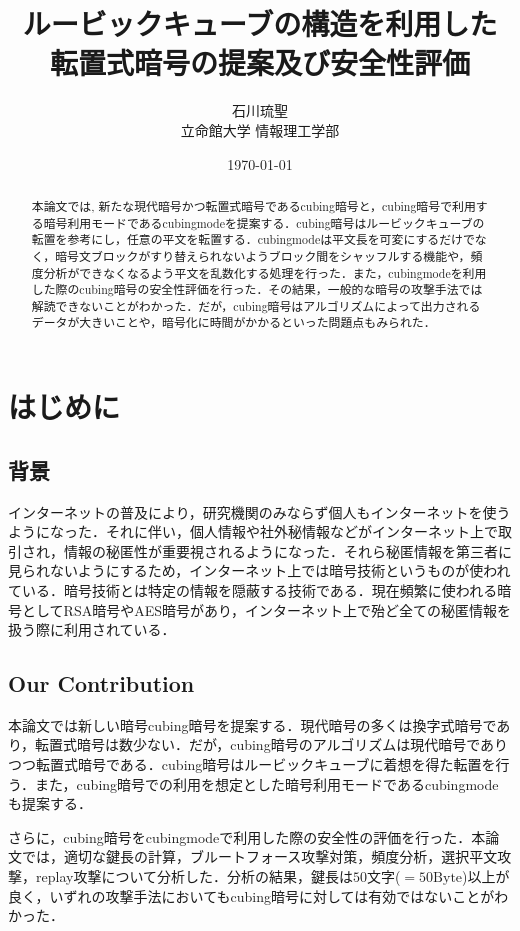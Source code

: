 \documentclass[a4j,titlepage]{jsarticle}
\title{ルービックキューブの構造を利用した\\転置式暗号の提案及び安全性評価}
\author{石川琉聖\\立命館大学 情報理工学部}
\date{\today}
\begin{document}
\maketitle

\begin{abstract}
本論文では, 新たな現代暗号かつ転置式暗号であるcubing暗号と，cubing暗号で利用する暗号利用モードであるcubingmodeを提案する．cubing暗号はルービックキューブの転置を参考にし，任意の平文を転置する．cubingmodeは平文長を可変にするだけでなく，暗号文ブロックがすり替えられないようブロック間をシャッフルする機能や，頻度分析ができなくなるよう平文を乱数化する処理を行った．また，cubingmodeを利用した際のcubing暗号の安全性評価を行った．その結果，一般的な暗号の攻撃手法では解読できないことがわかった．だが，cubing暗号はアルゴリズムによって出力されるデータが大きいことや，暗号化に時間がかかるといった問題点もみられた．
\end{abstract}

\setcounter{tocdepth}{3}
\tableofcontents
\newpage
{}

\section{はじめに}
\subsection{背景}
インターネットの普及により，研究機関のみならず個人もインターネットを使うようになった．それに伴い，個人情報や社外秘情報などがインターネット上で取引され，情報の秘匿性が重要視されるようになった．それら秘匿情報を第三者に見られないようにするため，インターネット上では暗号技術というものが使われている．暗号技術とは特定の情報を隠蔽する技術である．現在頻繁に使われる暗号としてRSA暗号やAES暗号があり，インターネット上で殆ど全ての秘匿情報を扱う際に利用されている．

\subsection{Our Contribution}
本論文では新しい暗号cubing暗号を提案する．現代暗号の多くは換字式暗号であり，転置式暗号は数少ない．だが，cubing暗号のアルゴリズムは現代暗号でありつつ転置式暗号である．cubing暗号はルービックキューブに着想を得た転置を行う．また，cubing暗号での利用を想定とした暗号利用モードであるcubingmodeも提案する．

さらに，cubing暗号をcubingmodeで利用した際の安全性の評価を行った．本論文では，適切な鍵長の計算，ブルートフォース攻撃対策，頻度分析，選択平文攻撃，replay攻撃について分析した．分析の結果，鍵長は\(50\)文字($=50 \text{Byte}$)以上が良く，いずれの攻撃手法においてもcubing暗号に対しては有効ではないことがわかった．
\end{document}
